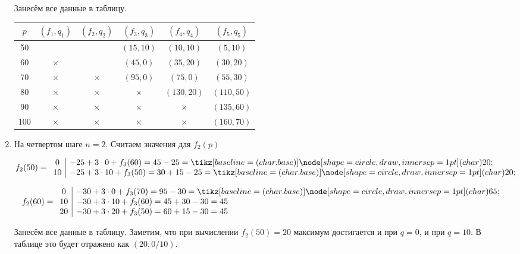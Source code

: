 \begin{enumerate}
	Занесём все данные в таблицу.
	
	\begin{table}[H]
		\centering
		\begin{tabular}{ | c | c | c | c | c | c | } 
			\hline
			$p$ & $(f_1, q_1)$ & $(f_2, q_2)$ & $(f_3, q_3)$ & $(f_4, q_4)$ & $(f_5, q_5)$ \\ 
			\hline
			50 & & & $(15, 10)$ & $(10, 10)$ & $(5, 10)$ \\\hline
			60 & $\times$ & & $(45, 0)$ & $(35, 20)$ & $(30, 20)$ \\\hline
			70 & $\times$ & $\times$ & $(95, 0)$ & $(75, 0)$ & $(55, 30)$ \\\hline
			80 & $\times$ & $\times$ & $\times$ & $(130, 20)$ & $(110, 50)$ \\\hline
			90 & $\times$ & $\times$ & $\times$ & $\times$ & $(135, 60)$ \\\hline
			100 & $\times$ & $\times$ & $\times$ & $\times$ & $(160, 70)$ \\\hline
		\end{tabular}
	\end{table}
	
		\item[\fbox{\textbf{Шаг 4}}] На четвертом шаге $n = 2$. Считаем значения для $f_2(p)$
	
	\[
	f_2(50) = \begin{array}{c|l}
		0 & -25 + 3 \cdot 0 + f_3(60) = 45 - 25 = \circled{20} \\
		10 & -25 + 3 \cdot 10 + f_3(50) = 30 + 15 - 25 = \circled{20} \\
	\end{array}
	\]
	
	\[
	f_2(60) = \begin{array}{c|l}
		0 & -30 + 3 \cdot 0 + f_3(70) = 95 - 30 = \circled{65} \\
		10 & -30 + 3 \cdot 10 + f_3(60) = 45 + 30 - 30 = 45 \\
		20 & -30 + 3 \cdot 20 + f_3(50) = 60 + 15 - 30 = 45 \\
	\end{array}
	\]
	
	Занесём все данные в таблицу. Заметим, что при вычислении $f_2(50) = 20$ максимум достигается и при $q = 0$, и при $q = 10$. В таблице это будет отражено как $(20, 0/10)$.
	

\end{enumerate}
